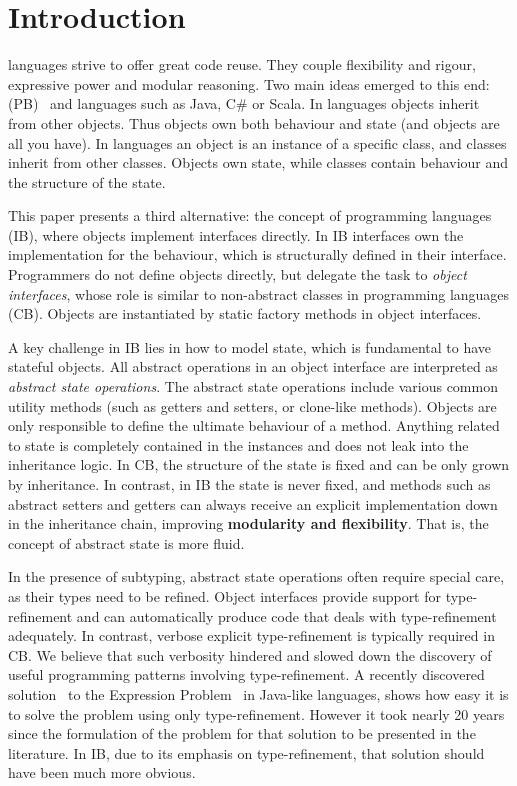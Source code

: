 \section{Introduction}\label{sec:intro}

\Objectoriented languages strive to offer great code reuse.
They couple flexibility and rigour, expressive power and
modular reasoning.  Two main ideas emerged to this end:
\prototypebased (PB)~\cite{Ungar87self} and \classbased languages such as
Java, C\# or Scala.  In \prototypebased
languages objects inherit from other objects. Thus objects own
both behaviour and state (and objects are all you have).
In \classbased languages an object is an instance of a specific class,
and classes inherit from other classes.  Objects own state,
while classes contain behaviour and the structure of the state.

This paper presents a third alternative: the concept of
\emph{\interfacebased} \objectoriented programming languages (IB), where objects
implement interfaces directly. In IB interfaces own the implementation
for the behaviour, which is structurally defined in their
interface. Programmers do not define objects directly, but delegate
the task to \emph{object interfaces}, whose role is similar to non-abstract
classes in \classbased \objectoriented programming languages
(CB). Objects 
are instantiated by static factory methods in object interfaces.

A key challenge in IB lies in how to model state, which is
fundamental to have stateful objects. All abstract operations in an
object interface are interpreted as \emph{abstract state
  operations}. The abstract state operations include various common
utility methods (such as getters and setters, or clone-like
methods). Objects are only responsible to define the ultimate
behaviour of a method. %
Anything related to state is completely contained in the
instances and does not leak into the inheritance logic.  In CB, the structure of the state is fixed and can be only grown
by inheritance.  In contrast, in IB the state is never
fixed, and methods such as abstract setters and getters
can always receive an explicit implementation down in the inheritance
chain, improving \textbf{modularity and flexibility}.  That is, the
concept of abstract state is more fluid.

In the presence of subtyping, abstract state operations often require
special care, as their types need to be refined. Object interfaces
provide support for type-refinement and can automatically produce code
that deals with type-refinement adequately. In contrast,
 verbose explicit type-refinement
 is typically required in CB.
  We believe that such verbosity hindered and slowed
down the discovery of useful programming patterns involving
type-refinement. A recently discovered
solution~\cite{eptrivially} to the Expression
Problem~\cite{wadler98expression} in Java-like languages, shows how easy it is to solve
the problem using only type-refinement. However it took nearly 20
years since the formulation of the problem for that
solution to be presented in the literature. In IB, due to
its emphasis on type-refinement, that solution should have been much
more obvious.

